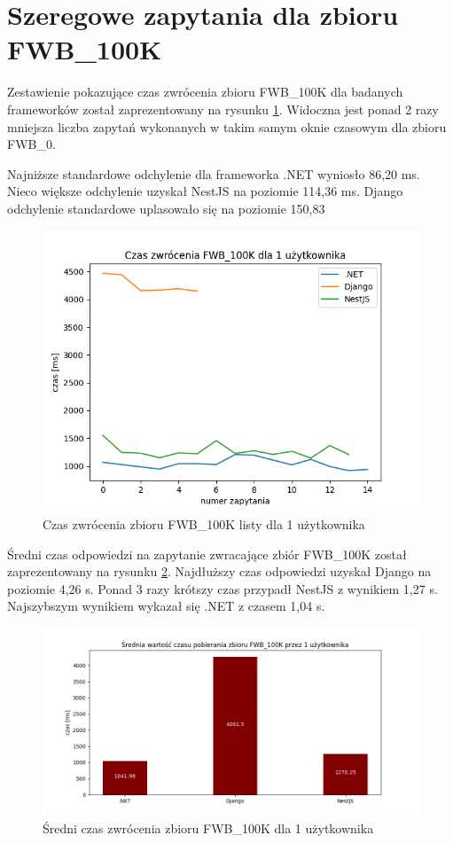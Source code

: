 \section{Szeregowe zapytania dla zbioru FWB\_100K}

Zestawienie pokazujące czas zwrócenia zbioru FWB\_100K dla badanych frameworków został zaprezentowany na rysunku \ref{rys:request_duration_for_FWB_100K}.
Widoczna jest ponad 2 razy mniejsza liczba zapytań wykonanych w takim samym oknie czasowym dla zbioru FWB\_0.

Najniższe standardowe odchylenie dla frameworka .NET wyniosło 86,20 ms.
Nieco większe odchylenie uzyskał NestJS na poziomie 114,36 ms.
Django odchylenie standardowe uplasowało się na poziomie 150,83

\begin{figure}[!hb]
	\centering \includegraphics[width=1\linewidth]{rysunki/Czas_zwrocenia_FWB_100K_dla_1_uzytkownika.png}
	\caption{Czas zwrócenia zbioru FWB\_100K listy dla 1 użytkownika}
	\label{rys:request_duration_for_FWB_100K}
\end{figure}

Średni czas odpowiedzi na zapytanie zwracające zbiór FWB\_100K został zaprezentowany na rysunku \ref{rys:mean_duration_for_FWB_100K}.
Najdłuższy czas odpowiedzi uzyskał Django na poziomie 4,26 s.
Ponad 3 razy krótszy czas przypadł NestJS z wynikiem 1,27 s.
Najszybszym wynikiem wykazał się .NET z czasem 1,04 s. 

\begin{figure}[!hb]
	\centering \includegraphics[width=1\linewidth]{rysunki/Srednia_wartosc_czasu_pobierania_zbioru_FWB_100K_przez_1_uzytkownika.png}
	\caption{Średni czas zwrócenia zbioru FWB\_100K dla 1 użytkownika}
	\label{rys:mean_duration_for_FWB_100K}
\end{figure}

